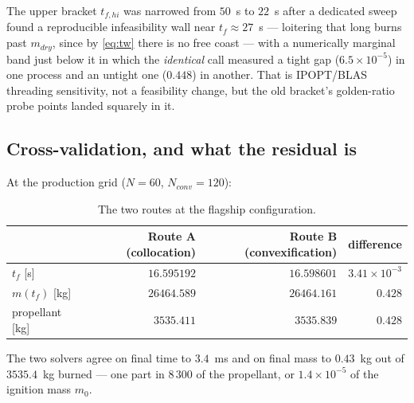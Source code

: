 \documentclass[11pt]{article}
\begin{document}
The upper bracket $t_{f,hi}$ was narrowed from $50$~s to $22$~s after a
dedicated sweep found a reproducible infeasibility wall near $t_f \approx
27$~s --- loitering that long burns past $m_{dry}$, since by
\eqref{eq:tw} there is no free coast --- with a numerically marginal band
just below it in which the \emph{identical} call measured a tight gap
($6.5\times10^{-5}$) in one process and an untight one ($0.448$) in another.
That is IPOPT/BLAS threading sensitivity, not a feasibility change, but the
old bracket's golden-ratio probe points landed squarely in it.

\subsection{Cross-validation, and what the residual is}
\label{sec:crossval}

At the production grid ($N = 60$, $N_{conv} = 120$):

\begin{table}[htbp]
\centering
\caption{The two routes at the flagship configuration.}
\label{tab:crossval}
\begin{tabular}{lrrr}
\toprule
& Route A (collocation) & Route B (convexification) & difference \\
\midrule
$t_f$ [s]        & $16.595192$  & $16.598601$ & $3.41\times10^{-3}$ \\
$m(t_f)$ [kg]    & $26464.589$  & $26464.161$ & $0.428$ \\
propellant [kg]  & $3535.411$   & $3535.839$  & $0.428$ \\
\bottomrule
\end{tabular}
\end{table}

The two solvers agree on final time to $3.4$~ms and on final mass to
$0.43$~kg out of $3535.4$~kg burned --- one part in $8\,300$ of the
propellant, or $1.4\times10^{-5}$ of the ignition mass $m_0$.
\end{document}

